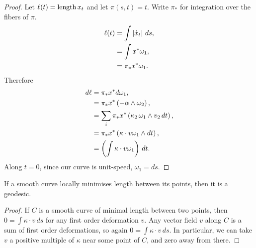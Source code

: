 \begin{proof}
Let \(\ell(t)=\length{x_t}\) and let \(\pi(s,t)=t\).
Write \(\pi_*\) for integration over the fibers of \(\pi\).
\begin{align*}
\ell(t)
&=
\int \norm{\dot{x}_t} \, ds,
\\
&=
\int x^*\omega_1,
\\
&=
\pi_* x^* \omega_1.
\end{align*}
Therefore
\begin{align*}
d\ell
&=
\pi_* x^* d \omega_1,
\\
&=
\pi_* x^* \left(-\alpha \wedge \omega_2\right),
\\
&=
\sum_i 
\pi_* x^* \left( \kappa_2 \, \omega_1 \wedge v_2 \, dt\right),
\\
&=
\pi_* x^* \left(\kappa \cdot v \omega_1 \wedge dt\right),
\\
&=
\left(\int \kappa \cdot v \omega_1 \right) \, dt.
\end{align*}
Along \(t=0\), since our curve is unit-speed, \(\omega_1=ds\).
\end{proof}
\begin{lemma}
If a smooth curve locally minimises length between its points, then it is a geodesic.
\end{lemma}
\begin{proof}
If \(C\) is a smooth curve of minimal length between two points, then \(0=\int \kappa \cdot v \, ds\) for any first order deformation \(v\).
Any vector field \(v\) along \(C\) is a sum of first order deformations, so again \(0=\int \kappa \cdot v \, ds\).
In particular, we can take \(v\) a positive multiple of \(\kappa\) near some point of \(C\), and zero away from there.
\end{proof}


